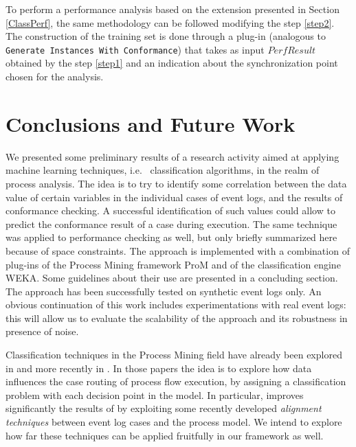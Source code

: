 \documentclass{llncs}
\begin{document}
To perform a performance analysis based on the extension presented in Section \ref{ClassPerf}, the same methodology can be followed modifying the step \ref{step2}. The construction of the training set is done through a plug-in (analogous to \texttt{Generate Instances With Conformance}) that takes as input $PerfResult$ obtained by the step \ref{step1} and an indication about the synchronization point chosen for the analysis.

\section{Conclusions and Future Work}

We presented some preliminary results of a research activity aimed at applying machine learning techniques, i.e.~ classification algorithms, in the realm of process analysis. The idea is to try to identify some correlation between the data value of certain variables in the individual cases of event logs, and the results of conformance checking. A successful identification of such values could allow to predict the conformance result  of a case during execution.  The same technique was applied to performance checking as well, but only briefly summarized here because of space constraints. The approach is implemented with a combination of plug-ins of the Process Mining framework ProM and of the classification engine WEKA. Some guidelines about their use are presented in a concluding section. 
The approach has been successfully tested on synthetic event logs only. An obvious continuation of this work includes experimentations with real event logs: this will allow us to evaluate the scalability of the approach and its robustness in presence of noise.


Classification techniques in the Process Mining field have already been explored in \cite{DBLP:conf/bpm/RozinatA06} and more recently in \cite{DBLP:conf/sac/LeoniA13}. In those papers the  idea is to  explore how data influences the case routing of process flow execution, by assigning a classification problem with each decision point in the model. In particular, \cite{DBLP:conf/sac/LeoniA13} improves significantly the results of \cite{DBLP:conf/bpm/RozinatA06} by exploiting some recently developed \emph{alignment techniques} between event log cases and the process model. We intend to explore how far these techniques can be applied fruitfully in our framework as well.



 
\end{document}
